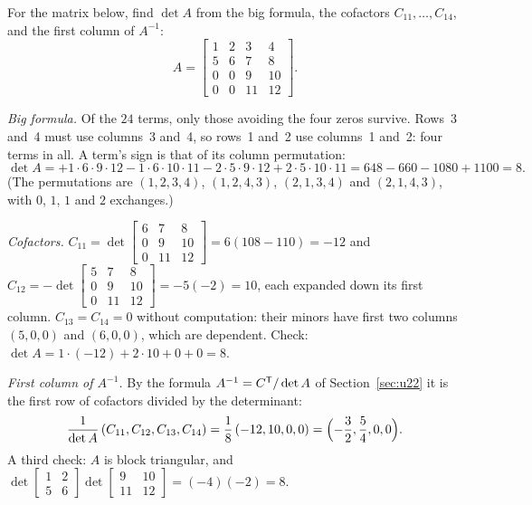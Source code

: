 \begin{example}\label{ex:u27-bigformula}
For the matrix below, find $\det A$ from the big formula, the cofactors
$C_{11},\dots,C_{14}$, and the first column of $A^{-1}$:
\[
  A=\begin{bmatrix} 1&2&3&4\\ 5&6&7&8\\ 0&0&9&10\\ 0&0&11&12\end{bmatrix}.
\]

\emph{Big formula.} Of the $24$ terms, only those avoiding the four zeros survive. Rows~3
and~4 must use columns~3 and~4, so rows~1 and~2 use columns~1 and~2: four terms in all. A
term's sign is that of its column permutation:
\[
  \det A=+1\cdot6\cdot9\cdot12-1\cdot6\cdot10\cdot11-2\cdot5\cdot9\cdot12+2\cdot5\cdot10\cdot11
  =648-660-1080+1100=8 .
\]
(The permutations are $(1,2,3,4)$, $(1,2,4,3)$, $(2,1,3,4)$ and $(2,1,4,3)$, with $0$, $1$, $1$
and $2$ exchanges.)

\emph{Cofactors.} $C_{11}=\det\left[\begin{smallmatrix} 6&7&8\\ 0&9&10\\ 0&11&12\end{smallmatrix}\right]=6(108-110)=-12$
and $C_{12}=-\det\left[\begin{smallmatrix} 5&7&8\\ 0&9&10\\ 0&11&12\end{smallmatrix}\right]=-5(-2)=10$,
each expanded down its first column. $C_{13}=C_{14}=0$ without computation: their minors have
first two columns $(5,0,0)$ and $(6,0,0)$, which are dependent. Check:
$\det A=1\cdot(-12)+2\cdot10+0+0=8$.

\emph{First column of $A^{-1}$.} By the formula $A^{-1}=C^{\mathsf{T}}/\det A$ of Section~\ref{sec:u22} it is the first row of
cofactors divided by the determinant:
\[
  \frac{1}{\det A}\,(C_{11},C_{12},C_{13},C_{14})=\frac18\,(-12,10,0,0)=\Bigl(-\frac32,\frac54,0,0\Bigr).
\]
A third check: $A$ is block triangular, and
$\det\left[\begin{smallmatrix} 1&2\\ 5&6\end{smallmatrix}\right]\det\left[\begin{smallmatrix} 9&10\\ 11&12\end{smallmatrix}\right]=(-4)(-2)=8$.
\end{example}

